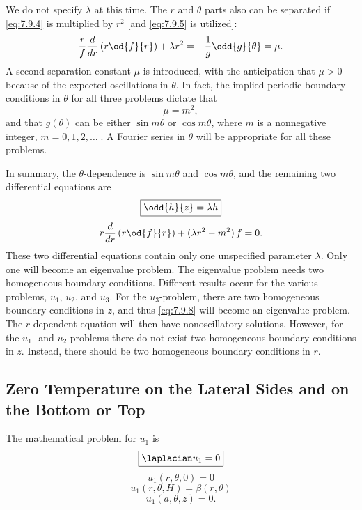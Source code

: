 We do not specify $\lambda$ at this time.  The $r$ and $\theta$ parts also can be separated if \eqref{eq:7.9.4} is multiplied by $r^2$ [and \eqref{eq:7.9.5} is utilized]:
\begin{equation}
\frac{r}{f}\frac{d}{d r}\left(r\od{f}{r}\right) + \lambda r^2 = -\frac{1}{g}\odd{g}{\theta} = \mu.
\label{eq:7.9.6}
\end{equation}
A second separation constant $\mu$ is introduced, with the anticipation that $\mu > 0$ because of the expected oscillations in $\theta$.  In fact, the implied periodic boundary conditions in $\theta$ for all three problems dictate that
\begin{equation}
\mu = m^2,
\label{eq:7.9.7}
\end{equation}
and that $g(\theta)$ can be either $\sin m\theta$ or $\cos m\theta$, where $m$ is a nonnegative integer, $m = 0, 1, 2, \ldots\;$.  A Fourier series in $\theta$ will be appropriate for all these problems.

In summary, the $\theta$-dependence is $\sin m\theta$ and $\cos m\theta$, and the remaining two differential equations are
\begin{equation}
\boxed{\odd{h}{z} = \lambda h}
\label{eq:7.9.8}
\end{equation}
\begin{equation}
r\frac{d}{d r}\left(r\od{f}{r}\right) + (\lambda r^2 - m^2)\,f = 0.
\label{eq:7.9.9}
\end{equation}
These two differential equations contain only one unspecified parameter $\lambda$.  Only one will become an eigenvalue problem.  The eigenvalue problem needs two homogeneous boundary conditions.  Different results occur for the various problems, $u_1$, $u_2$, and $u_3$.  For the $u_3$-problem, there are two homogeneous boundary conditions in $z$, and thus \eqref{eq:7.9.8} will become an eigenvalue problem.  The $r$-dependent equation will then have nonoscillatory solutions.  However, for the $u_1$- and $u_2$-problems there do not exist two homogeneous boundary conditions in $z$.  Instead, there should be two homogeneous boundary conditions in $r$.

\subsection{Zero Temperature on the Lateral Sides and on the Bottom or Top}
\label{sec:7.9.3}

The mathematical problem for $u_1$ is
\begin{equation}
\boxed{\laplacian u_1 = 0}
\label{eq:7.9.11}
\end{equation}
\begin{equation}
\boxed{u_1(r,\theta,0) = 0}
\label{eq:7.9.12}
\end{equation}
\begin{equation}
\boxed{u_1(r,\theta,H) = \beta(r,\theta)}
\label{eq:7.9.13}
\end{equation}
\begin{equation}
\boxed{u_1(a,\theta,z) = 0.}
\label{eq:7.9.14}
\end{equation}

